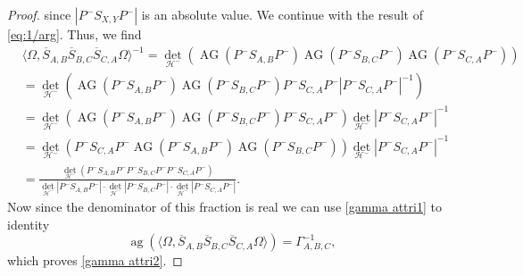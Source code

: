 \documentclass[b5paper,draft,openbib,12pt]{memoir}
\DeclareMathOperator{\ag}{ag}
\DeclareMathOperator{\AG}{AG}
\begin{document}
\begin{proof}
since \(|P^- S_{X,Y}P^-|\) is an absolute value. We continue with the result of \eqref{eq:1/arg}. Thus, we find
\begin{align}\label{eq: arg representation}
&\langle \Omega, \overline{S}_{A,B} \overline{S}_{B,C} \overline{S}_{C,A}\Omega\rangle^{-1}
=\det_{\mathcal{H}^-}\left(  \AG(P^- S_{A,B} P^-) \AG(P^- S_{B,C} P^-) \AG(P^-S_{C,A} P^-)  \right)\\
&=\det_{\mathcal{H}^-}\left(  \AG(P^- S_{A,B} P^-) \AG(P^- S_{B,C} P^-) P^-S_{C,A} P^- |P^-S_{C,A} P^-|^{-1}  \right)\\
&=\det_{\mathcal{H}^-}\left(  \AG(P^- S_{A,B} P^-) \AG(P^- S_{B,C} P^-) P^-S_{C,A} P^-  \right) \det_{\mathcal{H}^-}|P^-S_{C,A} P^-|^{-1} \\
&=\det_{\mathcal{H}^-}\left( P^-S_{C,A} P^- \AG(P^- S_{A,B} P^-) \AG(P^- S_{B,C} P^-)  \right) \det_{\mathcal{H}^-}|P^-S_{C,A} P^-|^{-1} \\
&=\frac{\det_{\mathcal{H}^-}\left(P^- S_{A,B} P^- P^- S_{B,C} P^- P^-S_{C,A} P^-  \right)}
{\det_{\mathcal{H}^-}|P^- S_{A,B} P^-| \cdot \det_{\mathcal{H}^-}|P^-S_{B,C} P^-| \cdot  \det_{\mathcal{H}^-}|P^-S_{C,A} P^-|}.
\end{align}
Now since the denominator of this fraction is real we can use \eqref{gamma attri1} to identity
\begin{equation}
\ag(\langle \Omega, \overline{S}_{A,B} \overline{S}_{B,C} \overline{S}_{C,A}\Omega\rangle)=\Gamma_{A,B,C}^{-1},
\end{equation}
which proves \eqref{gamma attri2}.


\end{proof}
\end{document}
